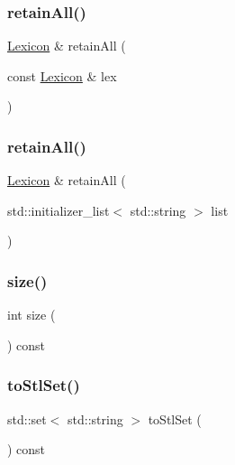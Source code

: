 \subsubsection{\texorpdfstring{retain\+All()}{retainAll()}\hspace{0.1cm}{\footnotesize\ttfamily [1/2]}}
{\footnotesize\ttfamily \mbox{\hyperlink{classLexicon}{Lexicon}} \& retain\+All (\begin{DoxyParamCaption}\item[{const \mbox{\hyperlink{classLexicon}{Lexicon}} \&}]{lex }\end{DoxyParamCaption})}

\mbox{\label{classLexicon_a17b175aadba16c14093da01963914b33}} 
\subsubsection{\texorpdfstring{retain\+All()}{retainAll()}\hspace{0.1cm}{\footnotesize\ttfamily [2/2]}}
{\footnotesize\ttfamily \mbox{\hyperlink{classLexicon}{Lexicon}} \& retain\+All (\begin{DoxyParamCaption}\item[{std\+::initializer\+\_\+list$<$ std\+::string $>$}]{list }\end{DoxyParamCaption})}

\mbox{\label{classLexicon_af9593d4a5ff4274efaf429cb4f9e57cc}} 
\subsubsection{\texorpdfstring{size()}{size()}}
{\footnotesize\ttfamily int size (\begin{DoxyParamCaption}{ }\end{DoxyParamCaption}) const}

\mbox{\label{classLexicon_a56b9ca7800c467295cab333fd9815291}} 
\subsubsection{\texorpdfstring{to\+Stl\+Set()}{toStlSet()}}
{\footnotesize\ttfamily std\+::set$<$ std\+::string $>$ to\+Stl\+Set (\begin{DoxyParamCaption}{ }\end{DoxyParamCaption}) const}

